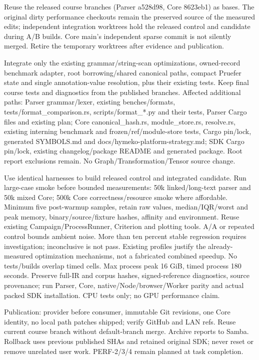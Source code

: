 \documentclass[11pt,a4paper]{article}
\begin{document}
Reuse the released course branches (Parser a528d98, Core 8623eb1) as bases.
The original dirty performance checkouts remain the preserved source of the
measured edits; independent integration worktrees hold the released control
and candidate during A/B builds. Core main's independent sparse commit is not
silently merged. Retire the temporary worktrees after evidence and publication.

Integrate only the existing grammar/string-scan optimizations, owned-record
benchmark adapter, root borrowing/shared canonical paths, compact Pruefer
state and single annotation-value resolution, plus their existing tests.
Keep final course tests and diagnostics from the published branches.
Affected additional paths: Parser grammar/lexer, existing benches/formats,
tests/format\_comparison.rs, scripts/format\_*.py and their tests, Parser
Cargo files and existing plan; Core canonical\_hash.rs, module\_store.rs,
resolve.rs, existing interning benchmark and frozen/ref/module-store tests,
Cargo pin/lock, generated SYMBOLS.md and docs/hymeko-platform-strategy.md;
SDK Cargo pin/lock, existing changelog/package README and generated package.
Root report exclusions remain. No Graph/Transformation/Tensor source change.

Use identical harnesses to build released control and integrated candidate.
Run large-case smoke before bounded measurements: 50k linked/long-text parser
and 50k mixed Core; 500k Core correctness/resource smoke where affordable.
Minimum five post-warmup samples, retain raw values, median/IQR/worst and peak
memory, binary/source/fixture hashes, affinity and environment. Reuse existing
Campaign/ProcessRunner, Criterion and plotting tools. A/A or repeated control
bounds ambient noise. More than ten percent stable regression requires
investigation; inconclusive is not pass. Existing profiles justify the
already-measured optimization mechanisms, not a fabricated combined speedup.
No tests/builds overlap timed cells. Max process peak 16 GiB, timed process
180 seconds. Preserve full-IR and corpus hashes, signed-reference diagnostics,
source provenance; run Parser, Core, native/Node/browser/Worker parity and
actual packed SDK installation. CPU tests only; no GPU performance claim.

Publication: provider before consumer, immutable Git revisions, one Core
identity, no local path patches shipped; verify GitHub and LAN refs. Reuse
current course branch without default-branch merge. Archive reports to Samba.
Rollback uses previous published SHAs and retained original SDK; never reset
or remove unrelated user work. PERF-2/3/4 remain planned at task completion.
\end{document}
